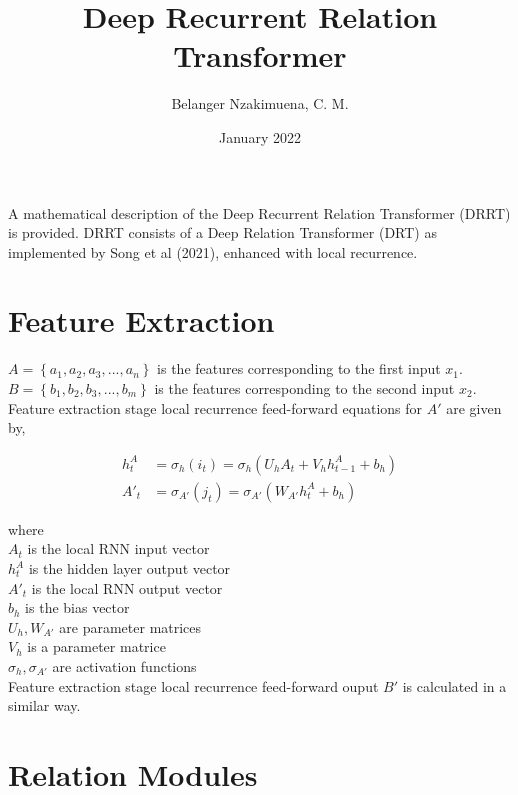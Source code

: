 \documentclass{article}
\title{Deep Recurrent Relation Transformer}
\author{Belanger Nzakimuena, C. M.}
\date{January 2022}
\begin{document}
\maketitle

\noindent A mathematical description of the Deep Recurrent Relation Transformer (DRRT) is provided.  DRRT consists of a Deep Relation Transformer (DRT) as implemented by Song et al (2021), enhanced with local recurrence.

\section{Feature Extraction}

\noindent $A = \left\{a_{1}, a_{2}, a_{3}, ..., a_{n}\right\}$ is the features corresponding to the first input $x_{1}$. \\
\noindent $B = \left\{b_{1}, b_{2}, b_{3}, ..., b_{m}\right\}$ is the features corresponding to the second input $x_{2}$. \\

\noindent Feature extraction stage local recurrence feed-forward equations for $A'$ are given by,

\begin{align}
h_{t}^{A} &= \sigma_{h}(i_{t}) = \sigma_{h}(U_{h}A_{t}+V_{h}h_{t-1}^{A}+b_{h}) \\
A'_{t} &= \sigma_{A'}(j_{t}) = \sigma_{A'}(W_{A'}h_{t}^{A}+b_{h})
\end{align}

where \\

\indent\indent $A_{t}$ is the local RNN input vector \\
\indent\indent $h_{t}^{A}$ is the hidden layer output vector \\
\indent\indent $A'_{t}$ is the local RNN output vector \\
\indent\indent $b_{h}$ is the bias vector \\
\indent\indent $U_{h}, W_{A'}$ are parameter matrices \\
\indent\indent $V_{h}$ is a parameter matrice \\
\indent\indent $\sigma_{h}, \sigma_{A'}$ are activation functions \\

\noindent Feature extraction stage local recurrence feed-forward ouput $B'$ is calculated in a similar way.

\section{Relation Modules}
\end{document}

